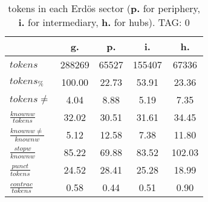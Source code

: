 \begin{table}[h!]
\begin{center}
\begin{tabular}{| l | c | c | c | c |}\hline
 & g. & p. & i. & h. \\\hline
$tokens$ & 288269  & 65527  & 155407  & 67336 \\\hline
$tokens_{\%}$ & 100.00  & 22.73  & 53.91  & 23.36 \\\hline
$tokens \neq$ & 4.04  & 8.88  & 5.19  & 7.35 \\\hline
$\frac{knownw}{tokens}$ & 32.02  & 30.51  & 31.61  & 34.45 \\\hline
$\frac{knownw \neq}{knownw}$ & 5.12  & 12.58  & 7.38  & 11.80 \\\hline
$\frac{stopw}{knownw}$ & 85.22  & 69.88  & 83.52  & 102.03 \\\hline
$\frac{punct}{tokens}$ & 24.52  & 28.41  & 25.28  & 18.99 \\\hline
$\frac{contrac}{tokens}$ & 0.58  & 0.44  & 0.51  & 0.90 \\\hline
\end{tabular}
\caption{tokens in each Erd\"os sector ({{\bf p.}} for periphery, {{\bf i.}} for intermediary, 
    {{\bf h.}} for hubs). TAG: 0}
\end{center}
\end{table}